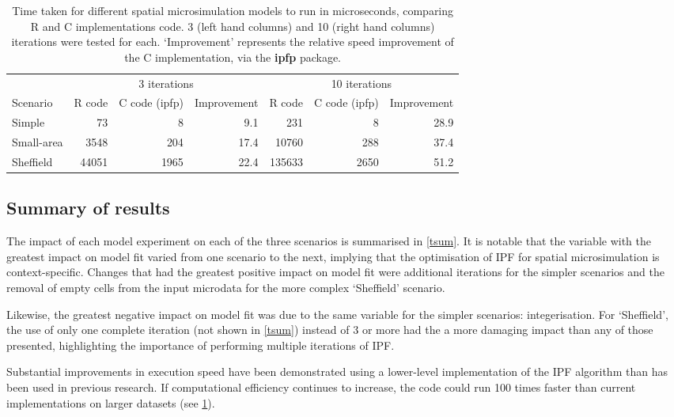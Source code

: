 \documentclass[a4paper,10pt]{article}
\begin{document}
\begin{table}[htbp]
\caption{Time taken for different spatial microsimulation models to run in microseconds, comparing
    R and C implementations code.
    3 (left hand columns) and 10 (right hand columns) iterations were tested for each.
    `Improvement' represents the
    relative speed improvement of the C implementation, via the \textbf{ipfp} package.}
    \begin{center}
\begin{tabular}{lrrrrrr}
\toprule
 & \multicolumn{ 3}{c}{3 iterations} & \multicolumn{ 3}{c}{10 iterations} \\
 Scenario & \multicolumn{1}{l}{R code} & \multicolumn{1}{l}{C code (ipfp)} & \multicolumn{1}{l}{Improvement} & \multicolumn{1}{l}{R code} & \multicolumn{1}{l}{C code (ipfp)} & \multicolumn{1}{l}{Improvement} \\
\midrule
Simple & 73 & 8 & 9.1 & 231 & 8 & 28.9 \\
Small-area & 3548 & 204 & 17.4 & 10760 & 288 & 37.4 \\
Sheffield & 44051 & 1965 & 22.4 & 135633 & 2650 & 51.2 \\
\bottomrule
\end{tabular}
\label{tspeed}
    \end{center}
\end{table}

\subsection{Summary of results}

The impact of each model experiment on each of the three scenarios
is summarised in \cref{tsum}. It is notable that the variable with the
greatest impact on model fit varied from one scenario to the next,
implying that the optimisation of IPF for spatial microsimulation is
context-specific. Changes that had the greatest positive impact on model
fit were additional iterations for the simpler scenarios and the removal of
empty cells from the input microdata for the more complex `Sheffield' scenario.

Likewise, the greatest negative impact on model fit was due to the same variable
for the simpler scenarios: integerisation. For `Sheffield', the
use of only one complete iteration (not shown in \cref{tsum})
instead of 3 or more had the a more damaging impact than any of those presented,
highlighting the importance of performing multiple iterations of IPF.

Substantial improvements in execution speed have been demonstrated using a lower-level
implementation of the IPF algorithm than has been used in previous research.
If computational efficiency continues to increase,
the code could run 100 times faster than current implementations
on larger datasets (see \cref{tspeed}).
\end{document}
